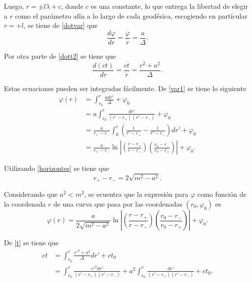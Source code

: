 Luego, $r=\pm l\lambda+c$, donde $c$ es una constante, lo que entrega la libertad de elegir a $r$ como el par\'ametro af\'in a lo largo de cada geod\'esica, escogiendo en part\'icular $r=+l$, se tiene de \eqref{dotvar} que
\begin{equation}\label{var1}
\frac{d \varphi}{dr}=\frac{\dot{\varphi}}{\dot{r}}=\frac{a}{\Delta}.
\end{equation}

Por otra parte de \eqref{dott2} se tiene que
\begin{equation}\label{t}
\frac{d(ct)}{dr}=\frac{c\dot{t}}{\dot{r}}=\frac{r^2+a^2}{\Delta}.
\end{equation}
 
Estas ecuaciones pueden ser integradas f\'acilmente. De \eqref{var1}  se tiene lo siguiente 
\begin{equation}
\begin{aligned}
\varphi(r)&=\int_{r_0}^r \frac{adr'}{\Delta} + \varphi_0\\
&=a\int_{r_0}^r\frac{dr'}{(r'-r_+)(r'-r_-)} + \varphi_0\\
&=\frac{a}{r_+-r_-}\int_{0}^r\left(\frac{1}{r'-r_+} - \frac{1}{r'-r_-} \right)dr'+\varphi_0\\
&=\frac{a}{r_+-r_-}\ln \left|\left(\frac{r-r_+}{r-r_-}\right)\left(\frac{r_0-r_-}{r_0-r_+} \right)\right| + \varphi_0.
\end{aligned}
\end{equation}
 
 Utilizando \eqref{horizontes} se tiene que 
 $$r_+-r_-=2\sqrt{m^2-a^2}.$$ 
 
 Considerando que $a^2<m^2$, se ecuentra que la expresi\'on para $\varphi$ como funci\'on de la coordenada $r$ de una curva que pasa por las coordenadas $(r_0,\varphi_0)$ es
\begin{equation}\label{congphi}
\boxed{\varphi(r)=\frac{a}{2\sqrt{m^2-a^2}}\ln \left|\left(\frac{r-r_+}{r-r_-}\right)\left(\frac{r_0-r_-}{r_0-r_+} \right)\right| + \varphi_0.}
\end{equation}  

De \eqref{t} se tiene que
\begin{equation}
\begin{aligned}
ct&=\int_{r_0}^r\frac{r'^2+a^2}{\Delta}dr'+ct_0\\
&=\int_{r_0}^r \frac{r'^2dr'}{(r'-r_+)(r'-r_-)}+a^2\int_{r_0}^r\frac{dr'}{(r'-r_+)(r'-r_-)}+ct_0.\\
\end{aligned}
\end{equation}

